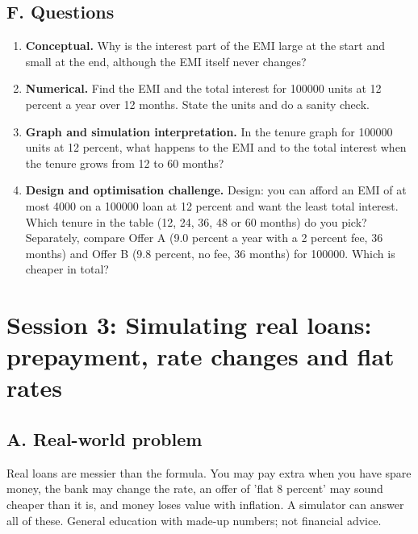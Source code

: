 \documentclass[11pt,a4paper]{article}
\begin{document}
\subsection*{F. Questions}
\begin{enumerate}[nosep]
\item \textbf{Conceptual.} Why is the interest part of the EMI large at the start and small at the end, although the EMI itself never changes?
\item \textbf{Numerical.} Find the EMI and the total interest for 100000 units at 12 percent a year over 12 months. State the units and do a sanity check.
\item \textbf{Graph and simulation interpretation.} In the tenure graph for 100000 units at 12 percent, what happens to the EMI and to the total interest when the tenure grows from 12 to 60 months?
\item \textbf{Design and optimisation challenge.} Design: you can afford an EMI of at most 4000 on a 100000 loan at 12 percent and want the least total interest. Which tenure in the table (12, 24, 36, 48 or 60 months) do you pick? Separately, compare Offer A (9.0 percent a year with a 2 percent fee, 36 months) and Offer B (9.8 percent, no fee, 36 months) for 100000. Which is cheaper in total?
\end{enumerate}

\section{Session 3: Simulating real loans: prepayment, rate changes and flat rates}

\subsection*{A. Real-world problem}
Real loans are messier than the formula. You may pay extra when you have spare money, the bank may change the rate, an offer of 'flat 8 percent' may sound cheaper than it is, and money loses value with inflation. A simulator can answer all of these. General education with made-up numbers; not financial advice.
\end{document}

